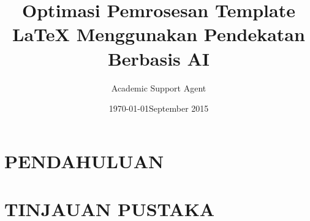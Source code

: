\documentclass{report}
\title{Optimasi Pemrosesan Template LaTeX Menggunakan Pendekatan Berbasis AI}
\author{Academic Support Agent}
\date{\today}
\begin{document}
\maketitle

\begin{abstract}

\end{abstract}

\chapter{PENDAHULUAN}


\chapter{TINJAUAN PUSTAKA}





\newcommand{\reporttitle}{Title}
\newcommand{\reportauthor}{Your name}
\newcommand{\supervisor}{Name of supervisor}
\newcommand{\degreetype}{Type of Degree}






\date{September 2015}
\end{document}
